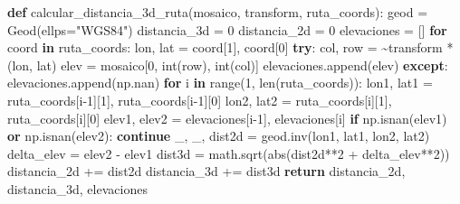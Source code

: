 \documentclass[
  letterpaper,
  DIV=11,
  numbers=noendperiod]{scrreprt}
\newenvironment{Shaded}{\begin{snugshade}}{\end{snugshade}}
\newcommand{\BuiltInTok}[1]{\textcolor[rgb]{0.00,0.23,0.31}{#1}}
\newcommand{\ControlFlowTok}[1]{\textcolor[rgb]{0.00,0.23,0.31}{\textbf{#1}}}
\newcommand{\DecValTok}[1]{\textcolor[rgb]{0.68,0.00,0.00}{#1}}
\newcommand{\KeywordTok}[1]{\textcolor[rgb]{0.00,0.23,0.31}{\textbf{#1}}}
\newcommand{\NormalTok}[1]{\textcolor[rgb]{0.00,0.23,0.31}{#1}}
\newcommand{\OperatorTok}[1]{\textcolor[rgb]{0.37,0.37,0.37}{#1}}
\newcommand{\StringTok}[1]{\textcolor[rgb]{0.13,0.47,0.30}{#1}}
\begin{document}
\begin{Shaded}
\begin{Highlighting}[]
\KeywordTok{def}\NormalTok{ calcular\_distancia\_3d\_ruta(mosaico, transform, ruta\_coords):}
\NormalTok{    geod }\OperatorTok{=}\NormalTok{ Geod(ellps}\OperatorTok{=}\StringTok{"WGS84"}\NormalTok{)}
\NormalTok{    distancia\_3d }\OperatorTok{=} \DecValTok{0}
\NormalTok{    distancia\_2d }\OperatorTok{=} \DecValTok{0}
\NormalTok{    elevaciones }\OperatorTok{=}\NormalTok{ []}
    \ControlFlowTok{for}\NormalTok{ coord }\KeywordTok{in}\NormalTok{ ruta\_coords:}
\NormalTok{        lon, lat }\OperatorTok{=}\NormalTok{ coord[}\DecValTok{1}\NormalTok{], coord[}\DecValTok{0}\NormalTok{]}
        \ControlFlowTok{try}\NormalTok{:}
\NormalTok{            col, row }\OperatorTok{=} \OperatorTok{\textasciitilde{}}\NormalTok{transform }\OperatorTok{*}\NormalTok{ (lon, lat)}
\NormalTok{            elev }\OperatorTok{=}\NormalTok{ mosaico[}\DecValTok{0}\NormalTok{, }\BuiltInTok{int}\NormalTok{(row), }\BuiltInTok{int}\NormalTok{(col)]}
\NormalTok{            elevaciones.append(elev)}
        \ControlFlowTok{except}\NormalTok{:}
\NormalTok{            elevaciones.append(np.nan)}
    \ControlFlowTok{for}\NormalTok{ i }\KeywordTok{in} \BuiltInTok{range}\NormalTok{(}\DecValTok{1}\NormalTok{, }\BuiltInTok{len}\NormalTok{(ruta\_coords)):}
\NormalTok{        lon1, lat1 }\OperatorTok{=}\NormalTok{ ruta\_coords[i}\OperatorTok{{-}}\DecValTok{1}\NormalTok{][}\DecValTok{1}\NormalTok{], ruta\_coords[i}\OperatorTok{{-}}\DecValTok{1}\NormalTok{][}\DecValTok{0}\NormalTok{]}
\NormalTok{        lon2, lat2 }\OperatorTok{=}\NormalTok{ ruta\_coords[i][}\DecValTok{1}\NormalTok{], ruta\_coords[i][}\DecValTok{0}\NormalTok{]}
\NormalTok{        elev1, elev2 }\OperatorTok{=}\NormalTok{ elevaciones[i}\OperatorTok{{-}}\DecValTok{1}\NormalTok{], elevaciones[i]}
        \ControlFlowTok{if}\NormalTok{ np.isnan(elev1) }\KeywordTok{or}\NormalTok{ np.isnan(elev2):}
            \ControlFlowTok{continue}
\NormalTok{        \_, \_, dist2d }\OperatorTok{=}\NormalTok{ geod.inv(lon1, lat1, lon2, lat2)}
\NormalTok{        delta\_elev }\OperatorTok{=}\NormalTok{ elev2 }\OperatorTok{{-}}\NormalTok{ elev1}
\NormalTok{        dist3d }\OperatorTok{=}\NormalTok{ math.sqrt(}\BuiltInTok{abs}\NormalTok{(dist2d}\OperatorTok{**}\DecValTok{2} \OperatorTok{+}\NormalTok{ delta\_elev}\OperatorTok{**}\DecValTok{2}\NormalTok{)) }
\NormalTok{        distancia\_2d }\OperatorTok{+=}\NormalTok{ dist2d}
\NormalTok{        distancia\_3d }\OperatorTok{+=}\NormalTok{ dist3d}
    \ControlFlowTok{return}\NormalTok{ distancia\_2d, distancia\_3d, elevaciones}


\end{Highlighting}
\end{Shaded}
\end{document}
